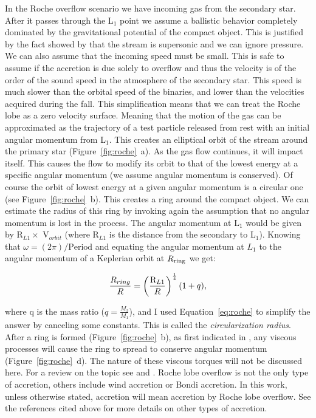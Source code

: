 In the Roche overflow scenario we have incoming gas from the secondary star. After it passes through the L$_1$ point we assume a ballistic behavior completely dominated by the gravitational potential of the compact object. This is justified by the fact showed by \cite{lubow_gas_1975} that the stream is supersonic and we can ignore pressure. We can also assume that the incoming speed must be small. This is safe to assume if the accretion is due solely to overflow and thus the velocity is of the order of the sound speed in the atmosphere of the secondary star. This speed is much slower than the orbital speed of the binaries,  and lower than the velocities acquired during the fall. This simplification means that we can treat the Roche lobe as a zero velocity surface. Meaning that the motion of the gas can be approximated as the trajectory of a test particle released from rest with an initial angular momentum from L$_1$. This creates an elliptical orbit of the stream around the primary star (Figure~\ref{fig:roche}~a). As the gas flow continues, it will impact itself. This causes the flow to modify its orbit to that of the lowest energy at a specific angular momentum (we assume angular momentum is conserved). Of course the orbit of lowest energy at a given angular momentum is a circular one (see Figure~\ref{fig:roche}~b). This creates a ring around the compact object.  We can estimate the radius of this ring by invoking again the assumption that no angular momentum is lost in the process. The angular momentum at L$_1$ would be given by  R$_{L1} \times$  V$_{orbit}$ (where R$_{L1}$ is the distance from the secondary to L$_1$). Knowing that $\omega = (2 \pi)/\text{Period}$ and equating the angular momentum at $L_1$ to the angular momentum of a Keplerian orbit at $R_{\rm ring}$ we get:


\begin{equation}
        \frac{R_{ring}}{R} = \left ( \frac{\text R _{L1}}{R} \right ) ^{\frac{1}{4}} (1+q),
\end{equation}

\noindent where q is the mass ratio ($q=\frac{M_2}{M_1}$), and I used Equation~\ref{eq:roche} to simplify the answer by canceling some constants. This is called the \emph{circularization radius}. After a ring is formed (Figure~\ref{fig:roche}~b), as first indicated in \cite{lynden-bell_evolution_1974}, any viscous processes will cause the ring to spread to conserve angular momentum (Figure~\ref{fig:roche}~d). The nature of these viscous torques will not be discussed here. For a review on the topic see \cite{frank_accretion_2002} and \cite{verbunt_accretion_1982}. Roche lobe overflow is not the only type of accretion, others include wind accretion or Bondi accretion. In this work, unless otherwise stated, accretion will mean accretion by Roche lobe overflow. See the references cited above for more details on other types of accretion. 


